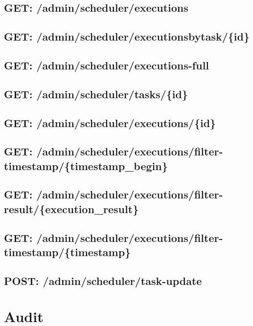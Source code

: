  \subsection*{GET: /admin/scheduler/executions}

 \subsection*{GET: /admin/scheduler/executionsbytask/\{id\}}

 \subsection*{GET: /admin/scheduler/executions-full}

 \subsection*{GET: /admin/scheduler/tasks/\{id\}}

 \subsection*{GET: /admin/scheduler/executions/\{id\}}

 \subsection*{GET: /admin/scheduler/executions/filter-timestamp/\{timestamp\_begin\}}

 \subsection*{GET: /admin/scheduler/executions/filter-result/\{execution\_result\}}

 \subsection*{GET: /admin/scheduler/executions/filter-timestamp/\{timestamp\}}

 \subsection*{POST: /admin/scheduler/task-update}

 

\section{Audit}

